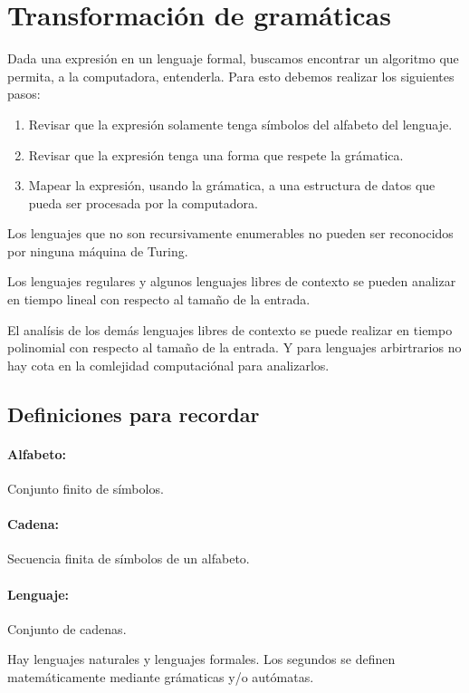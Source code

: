 \section{Transformación de gramáticas}
Dada una expresión en un lenguaje formal, buscamos encontrar un algoritmo que permita, a la computadora, entenderla. Para esto debemos realizar los siguientes pasos:
\begin{enumerate}
  \item Revisar que la expresión solamente tenga símbolos del alfabeto del lenguaje.
  \item Revisar que la expresión tenga una forma que respete la grámatica.
  \item Mapear la expresión, usando la grámatica, a una estructura de datos que pueda ser procesada por la computadora.
\end{enumerate}

Los lenguajes que no son recursivamente enumerables no pueden ser reconocidos por ninguna máquina de Turing.

Los lenguajes regulares y algunos lenguajes libres de contexto se pueden analizar en tiempo lineal con respecto al tamaño de la entrada.

El analísis de los demás lenguajes libres de contexto se puede realizar en tiempo polinomial con respecto al tamaño de la entrada. Y para lenguajes arbirtrarios no hay cota en la comlejidad computaciónal para analizarlos.

\subsection{Definiciones para recordar}
\paragraph{Alfabeto:} Conjunto finito de símbolos.
\paragraph{Cadena:} Secuencia finita de símbolos de un alfabeto.
\paragraph{Lenguaje:} Conjunto de cadenas.

Hay lenguajes naturales y lenguajes formales. Los segundos se definen matemáticamente mediante grámaticas y/o autómatas.

